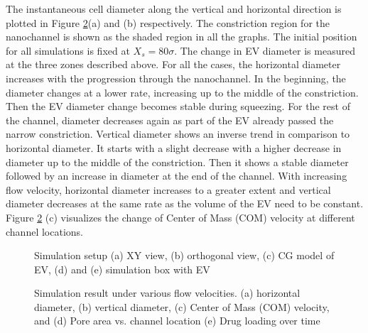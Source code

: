 The instantaneous cell diameter along the vertical and horizontal direction is plotted in Figure \ref{fig:6}(a) and (b) respectively. The constriction region for the nanochannel is shown as the shaded region in all the graphs. The initial position for all simulations is fixed at $X_s=80\sigma$. The change in EV diameter is measured at the three zones described above. For all the cases, the horizontal diameter increases with the progression through the nanochannel.
In the beginning, the diameter changes at a lower rate, increasing up to the middle of the constriction. Then the EV diameter change becomes stable during squeezing. For the rest of the channel, diameter decreases again as part of the EV already passed the narrow constriction. Vertical diameter shows an inverse trend in comparison to horizontal diameter. It starts with a slight decrease with a higher decrease in diameter up to the middle of the constriction. Then it shows a stable diameter followed by an increase in diameter at the end of the channel. With increasing flow velocity, horizontal diameter increases to a greater extent and vertical diameter decreases at the same rate as the volume of the EV need to be constant. Figure \ref{fig:6} (c) visualizes the change of Center of Mass (COM) velocity at different channel locations. 
\\

\begin{figure}[htbp]
  \centering
  
  \vspace{0.5cm}
  \caption{ Simulation setup (a) XY view, (b) orthogonal view, (c) CG model of EV, (d) and (e) simulation box with EV}
  \label{fig:5}
\end{figure}

\begin{figure}[htbp]
  \centering
  
  \vspace{0.5cm}
  \caption{Simulation result under various flow velocities. (a) horizontal diameter, (b) vertical diameter, (c) Center of Mass (COM) velocity, and (d) Pore area vs. channel location (e) Drug loading over time}
  \label{fig:6}
\end{figure}

